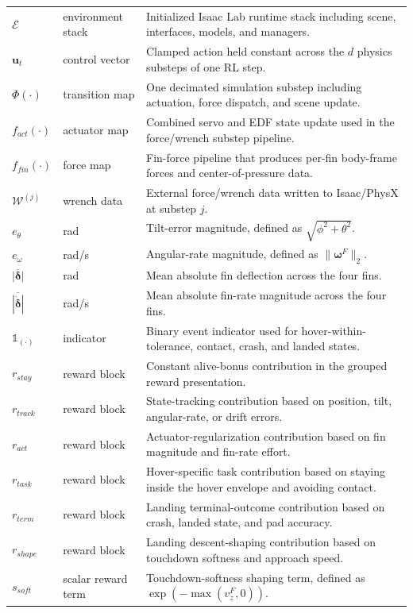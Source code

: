 \documentclass[10pt,twocolumn]{article}
\begin{document}
\begin{table}[!t]
\begin{tabularx}{\textwidth}{@{}p{1.25in}p{1.50in}X@{}}
$\mathcal{E}$ & environment stack & Initialized Isaac Lab runtime stack including scene, interfaces, models, and managers. \\
$\mathbf{u}_t$ & control vector & Clamped action held constant across the $d$ physics substeps of one RL step. \\
$\Phi(\cdot)$ & transition map & One decimated simulation substep including actuation, force dispatch, and scene update. \\
$f_{act}(\cdot)$ & actuator map & Combined servo and EDF state update used in the force/wrench substep pipeline. \\
$f_{fin}(\cdot)$ & force map & Fin-force pipeline that produces per-fin body-frame forces and center-of-pressure data. \\
$\mathcal{W}^{(j)}$ & wrench data & External force/wrench data written to Isaac/PhysX at substep $j$. \\
$e_\theta$ & rad & Tilt-error magnitude, defined as $\sqrt{\phi^2+\theta^2}$. \\
$e_\omega$ & rad/s & Angular-rate magnitude, defined as $\|\boldsymbol{\omega}^{F}\|_2$. \\
$\overline{|\boldsymbol{\delta}|}$ & rad & Mean absolute fin deflection across the four fins. \\
$\overline{|\dot{\boldsymbol{\delta}}|}$ & rad/s & Mean absolute fin-rate magnitude across the four fins. \\
$\mathbb{1}_{(\cdot)}$ & indicator & Binary event indicator used for hover-within-tolerance, contact, crash, and landed states. \\
$r_{stay}$ & reward block & Constant alive-bonus contribution in the grouped reward presentation. \\
$r_{track}$ & reward block & State-tracking contribution based on position, tilt, angular-rate, or drift errors. \\
$r_{act}$ & reward block & Actuator-regularization contribution based on fin magnitude and fin-rate effort. \\
$r_{task}$ & reward block & Hover-specific task contribution based on staying inside the hover envelope and avoiding contact. \\
$r_{term}$ & reward block & Landing terminal-outcome contribution based on crash, landed state, and pad accuracy. \\
$r_{shape}$ & reward block & Landing descent-shaping contribution based on touchdown softness and approach speed. \\
$s_{soft}$ & scalar reward term & Touchdown-softness shaping term, defined as $\exp(-\max(v_z^{F},0))$. \\

\end{tabularx}
\end{table}
\end{document}
